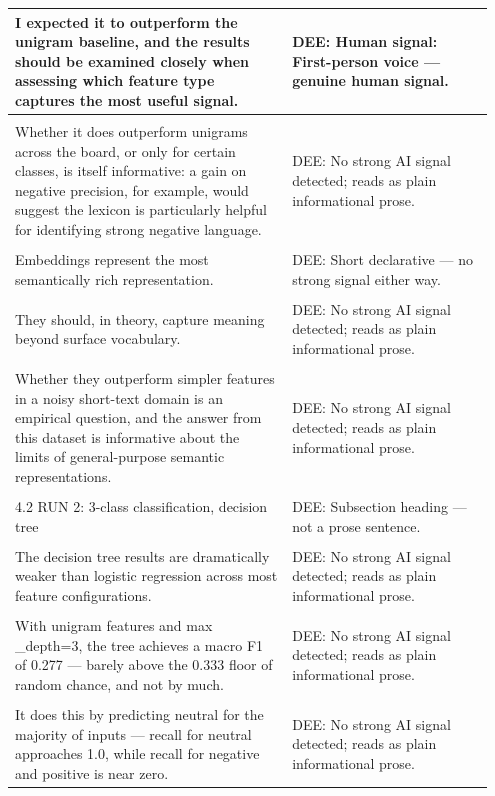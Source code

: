 \documentclass[11pt]{article}
\begin{document}
\begin{longtable}{|p{0.55\linewidth}|p{0.40\linewidth}|}
\hline
I expected it to outperform the unigram baseline, and the results should be examined closely when assessing which feature type captures the most useful signal. & DEE: Human signal: First-person voice --- genuine human signal. \\[2pt]
\hline
\rule{0pt}{3.5cm} & \\
\hline
Whether it does outperform unigrams across the board, or only for certain classes, is itself informative: a gain on negative precision, for example, would suggest the lexicon is particularly helpful for identifying strong negative language. & DEE: No strong AI signal detected; reads as plain informational prose. \\[2pt]
\hline
\rule{0pt}{3.5cm} & \\
\hline
Embeddings represent the most semantically rich representation. & DEE: Short declarative --- no strong signal either way. \\[2pt]
\hline
\rule{0pt}{3.5cm} & \\
\hline
They should, in theory, capture meaning beyond surface vocabulary. & DEE: No strong AI signal detected; reads as plain informational prose. \\[2pt]
\hline
\rule{0pt}{3.5cm} & \\
\hline
Whether they outperform simpler features in a noisy short-text domain is an empirical question, and the answer from this dataset is informative about the limits of general-purpose semantic representations. & DEE: No strong AI signal detected; reads as plain informational prose. \\[2pt]
\hline
\rule{0pt}{3.5cm} & \\
\hline
4.2 RUN 2: 3-class classification, decision tree & DEE: Subsection heading --- not a prose sentence. \\[2pt]
\hline
\rule{0pt}{3.5cm} & \\
\hline
The decision tree results are dramatically weaker than logistic regression across most feature configurations. & DEE: No strong AI signal detected; reads as plain informational prose. \\[2pt]
\hline
\rule{0pt}{3.5cm} & \\
\hline
With unigram features and max \_depth=3, the tree achieves a macro F1 of 0.277 --- barely above the 0.333 floor of random chance, and not by much. & DEE: No strong AI signal detected; reads as plain informational prose. \\[2pt]
\hline
\rule{0pt}{3.5cm} & \\
\hline
It does this by predicting neutral for the majority of inputs --- recall for neutral approaches 1.0, while recall for negative and positive is near zero. & DEE: No strong AI signal detected; reads as plain informational prose. \\[2pt]

\end{longtable}
\end{document}
